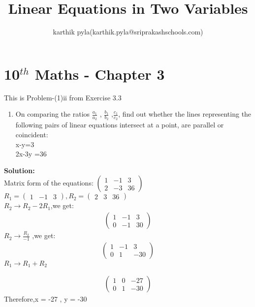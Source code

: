 \documentclass[12pt]{article}
\title{Linear Equations in Two Variables}
\author{karthik pyla(karthik.pyla@sriprakashschools.com)}
\newcommand{\myvec}[1]{\ensuremath{\begin{pmatrix}#1\end{pmatrix}}}
\newcommand{\solution}{\noindent \textbf{Solution: }}
\begin{document}
\maketitle
\section*{10$^{th}$ Maths - Chapter 3}
This is Problem-(1)ii from Exercise 3.3
\begin{enumerate}
\item On comparing the ratios $\frac{a_1}{a_2}$ , $\frac{b_1}{b_2}$ ,$\frac{c_1}{c_2}$, find out whether the lines representing the following pairs of linear equations intersect at a point, are parallel or coincident:\\
x-y=3\\ 
2x-3y =36\\
\end{enumerate}

\solution \\
Matrix form of the equations:
$\myvec{1 & -1 & 3\\2 & -3 & 36}$\\
$R_1=\myvec{1 & -1 & 3},R_2=\myvec{2 & 3 & 36}$\\
$R_2\rightarrow R_2 - 2R_1$,we get:
\begin{align}
\myvec{1 & -1 & 3\\0 & -1 & 30}
\end{align}
$R_2\rightarrow \frac{R_2}{-1}$ ,we get:
\begin{align}
\myvec{1 & -1 & 3\\0 & 1 & -30}
\end{align}
$R_1\rightarrow R_1 + R_2 $

\begin{align}
\myvec{1 & 0 & -27\\0 & 1 & -30}
\end{align}
Therefore,x = -27 , y = -30
\end{document}

